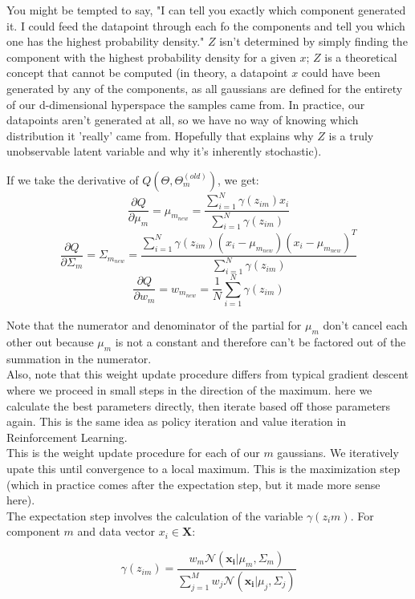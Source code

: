 \documentclass[12pt]{article}
\begin{document}
You might be tempted to say, "I can tell you exactly which component generated it. I could feed the datapoint through each fo the components and tell you which one has the highest probability density." \(Z\) isn't determined by simply finding the component with the highest probability density for a given \(x\); \(Z\) is a theoretical concept that cannot be computed (in theory, a datapoint \(x\) could have been generated by any of the components, as all gaussians are defined for the entirety of our d-dimensional hyperspace the samples came from. In practice, our datapoints aren't generated at all, so we have no way of knowing which distribution it 'really' came from. Hopefully that explains why \(Z\) is a truly unobservable latent variable and why it's inherently stochastic).

If we take the derivative of \(Q(\Theta, \Theta_m^{(old)})\), we get: 
\[\frac{\partial Q}{\partial \mu_m} = \mu_{m_{new}} = \frac{\sum_{i=1}^N \gamma(z_{im}) x_i}{\sum_{i=1}^N \gamma(z_{im})}\]
\[\frac{\partial Q}{\partial \Sigma_m} = \Sigma_{m_{new}}=\frac{\sum_{i=1}^N \gamma(z_{im}) (x_i - \mu_{m_{new}})(x_i - \mu_{m_{new}})^T}{\sum_{i=1}^N  \gamma(z_{im})} \]
\[\frac{\partial Q}{\partial w_m} = w_{m_{new}} = \frac{1}{N}\sum_{i=1}^N \gamma(z_{im}) \]

Note that the numerator and denominator of the partial for \(\mu_m\) don't cancel each other out because \(\mu_m\) is not a constant and therefore can't be factored out of the summation in the numerator. \\

Also, note that this weight update procedure differs from typical gradient descent where we proceed in small steps in the direction of the maximum. here we calculate the best parameters directly, then iterate based off those parameters again. This is the same idea as policy iteration and value iteration in Reinforcement Learning.\\

This is the weight update procedure for each of our \(m\) gaussians. We iteratively upate this until convergence to a local maximum. This is the maximization step (which in practice comes after the expectation step, but it made more sense here). \\

The expectation step involves the calculation of the variable \(\gamma(z_im)\). For component \(m\) and data vector \(x_i \in \mathbf{X}\):

\[\gamma(z_{im}) = \frac{w_m \mathcal{N}(\mathbf{x_i}|\mu_m, \Sigma_m)}{\sum_{j=1}^M w_j \mathcal{N}(\mathbf{x_i}|\mu_j, \Sigma_j)}\]
\end{document}
